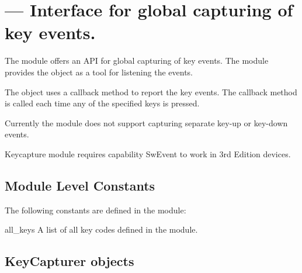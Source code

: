 %
%
%

\section{ ---
         Interface for global capturing of key events.}
\label{sec:keycapture}


The  module offers an API for global capturing of key events. The 
 module provides the  object as a tool for listening the 
events.

The  object uses a callback method to report the key 
events. The callback method is called each time any of the specified keys 
is pressed.

Currently the  module does not support capturing separate key-up or
key-down events.

\begin{notice}[note]
Keycapture module requires capability SwEvent to work in 3rd Edition devices.
\end{notice}

\subsection{Module Level Constants}
The following constants are defined in the  module:

\begin{datadesc}{all_keys}
A list of all key codes defined in the  module.
\end{datadesc}

\subsection{KeyCapturer objects} 
\label{KeyCapturer objects}

